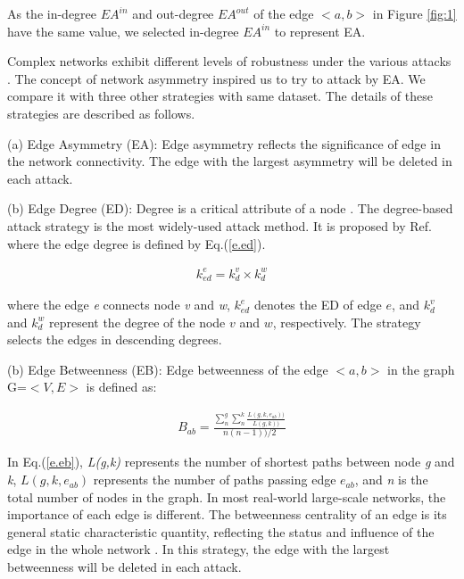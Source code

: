 \documentclass[aps,prl,twocolumn,showpacs,superscriptaddress,groupedaddress]{revtex4}  %
\begin{document}
As the in-degree $EA^{in}$  and out-degree $EA^{out}$ of the edge $<a, b>$ in Figure \ref{fig:1} have the same value, we selected in-degree $EA^{in}$ to represent EA.


Complex networks exhibit different levels of robustness under the various attacks \cite{Albert2000Error}\cite{crucitti2004error}. The concept of network asymmetry inspired us to try to
attack by EA. We compare it with three other strategies with same dataset. The details of these strategies are described as follows.

(a) Edge Asymmetry (EA): Edge asymmetry reflects the significance of edge in the network connectivity. The edge with the largest asymmetry will be deleted in each attack.

(b) Edge Degree (ED): Degree is a critical attribute of a node \cite{Strogatz2000Network}. The degree-based attack strategy is the most widely-used attack method. It is proposed by Ref. \cite{Holme2002Attack} where the edge degree is defined by Eq.(\ref{e.ed}).

\setlength{\abovedisplayskip}{2pt}
\begin{eqnarray}
 k^e_{ed} = k^v_d \times k^w_d
\label{e.ed}
\end{eqnarray}
\setlength{\belowdisplayskip}{2pt}

where the edge \emph{e} connects node \emph{v} and \emph{w}, $k^e_{ed}$ denotes the ED of edge $e$, and $k^v_d$ and $k^w_d$ represent the degree of the node $v$ and $w$, respectively. The strategy selects the edges in descending degrees.

(b) Edge Betweenness (EB): Edge betweenness of the edge $<a, b>$ in the graph  G=$<V,E>$  is defined as:

\setlength{\abovedisplayskip}{2pt}
\begin{eqnarray}
B_{ab}=\frac{\sum_{n}^{g}\sum_{n}^{k}\frac{L(g,k,e_{ab}))}{L(g,k))}}{n(n-1))/2}
\label{e.eb}
\end{eqnarray}
\setlength{\belowdisplayskip}{2pt}

In Eq.(\ref{e.eb}), \emph{L(g,k)} represents the number of shortest paths between node \emph{g} and \emph{k}, $L(g,k,e_{ab})$ represents the number of paths passing edge $e_{ab}$, and \emph{n} is the total number of nodes in the graph. In most real-world large-scale networks, the importance of each edge is different. The betweenness centrality of an edge is its general static characteristic quantity, reflecting the status and influence of the edge in the whole network \cite{He2009Betweenness}. In this strategy, the edge with the largest betweenness will be deleted in each attack.
\end{document}
